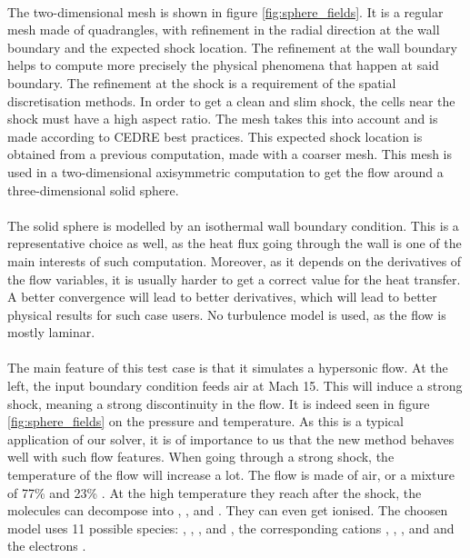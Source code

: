         \paragraph{}
        The two-dimensional mesh is shown in figure \ref{fig:sphere_fields}.
        It is a regular mesh made of quadrangles, with refinement in the radial direction at the wall boundary and the expected shock location.
        The refinement at the wall boundary helps to compute more precisely the physical phenomena that happen at said boundary.
        The refinement at the shock is a requirement of the spatial discretisation methods.
        In order to get a clean and slim shock, the cells near the shock must have a high aspect ratio.
        The mesh takes this into account and is made according to CEDRE best practices.
        This expected shock location is obtained from a previous computation, made with a coarser mesh.
        This mesh is used in a two-dimensional axisymmetric computation to get the flow around a three-dimensional solid sphere.

        \paragraph{}
        The solid sphere is modelled by an isothermal wall boundary condition.
        This is a representative choice as well, as the heat flux going through the wall is one of the main interests of such computation.
        Moreover, as it depends on the derivatives of the flow variables, it is usually harder to get a correct value for the heat transfer.
        A better convergence will lead to better derivatives, which will lead to better physical results for such case users.
        No turbulence model is used, as the flow is mostly laminar.

        \paragraph{}
        The main feature of this test case is that it simulates a hypersonic flow.
        At the left, the input boundary condition feeds air at Mach 15.
        This will induce a strong shock, meaning a strong discontinuity in the flow.
        It is indeed seen in figure \ref{fig:sphere_fields} on the pressure and temperature.
        As this is a typical application of our solver, it is of importance to us that the new method behaves well with such flow features.
        When going through a strong shock, the temperature of the flow will increase a lot.
        The flow is made of air, or a mixture of 77\%  and 23\% .
        At the high temperature they reach after the shock, the molecules can decompose into , , and .
        They can even get ionised.
        The choosen model uses 11 possible species: , , ,  and , the corresponding cations , , ,  and  and the electrons .


